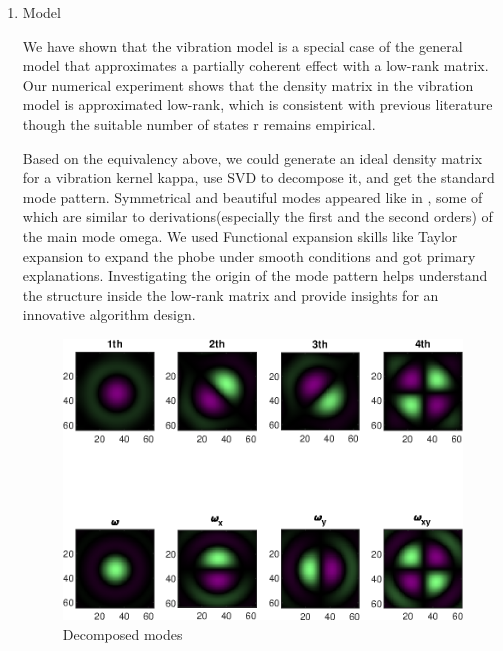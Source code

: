 \documentclass{article}
\numberwithin{equation}{section}
\begin{document}
\begin{enumerate}[leftmargin=*]

\item Model 


We have shown that the vibration model is a special case of the general model that approximates a partially coherent effect with a low-rank matrix. Our numerical experiment shows that the density matrix in the vibration model is approximated low-rank, which is consistent with previous literature though the suitable number of states r remains empirical. 

Based on the equivalency above, we could generate an ideal density matrix for a vibration kernel kappa, use SVD to decompose it, and get the standard mode pattern. Symmetrical and beautiful modes appeared like in \cite{chang}, some of which are similar to derivations(especially the first and the second orders) of the main mode omega. We used Functional expansion skills like Taylor expansion to expand the phobe under smooth conditions and got primary explanations. Investigating the origin of the mode pattern helps understand the structure inside the low-rank matrix and provide insights for an innovative algorithm design.  


\begin{figure}[H]
\centering

\includegraphics[width=0.9\linewidth]{../figures/gradients.eps} 
\caption{Decomposed modes} 
 \end{figure}
 

\end{enumerate}
\end{document}
